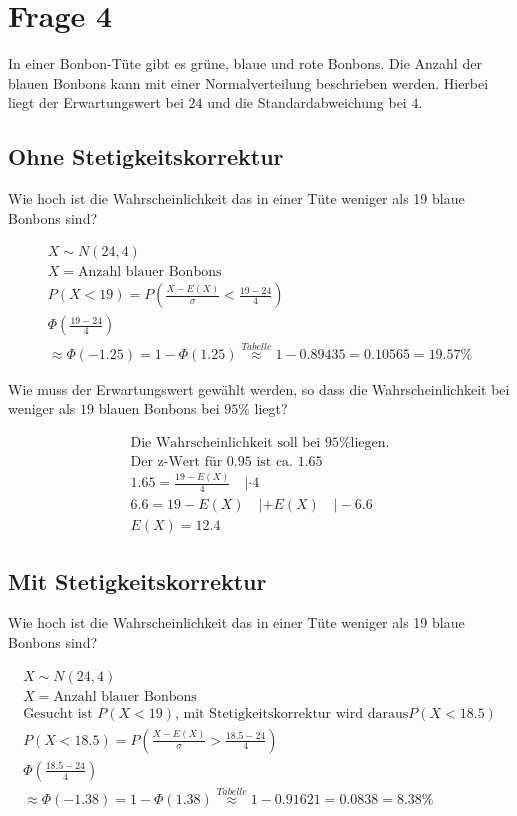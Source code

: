 \section{Frage 4}

In einer Bonbon-Tüte gibt es grüne, blaue und rote Bonbons. Die Anzahl der blauen Bonbons kann mit einer Normalverteilung beschrieben werden. Hierbei liegt der Erwartungswert bei $24$ und die Standardabweichung bei $4$.

\subsection{Ohne Stetigkeitskorrektur}

Wie hoch ist die Wahrscheinlichkeit das in einer Tüte weniger als 19 blaue Bonbons sind?

\begin{align*}
    X \sim N(24, 4) \\
    X = \text{Anzahl blauer Bonbons} \\
    P(X < 19) = P\left(\frac{X - E(X)}{\sigma} < \frac{19 - 24}{4}\right) \\
    \Phi(\frac{19 - 24}{4}) \\
    \approx \Phi(-1.25) = 1 - \Phi(1.25) \overset{Tabelle}{\approx} 1 - 0.89435 = 0.10565 = 19.57\%
\end{align*}

Wie muss der Erwartungswert gewählt werden, so dass die Wahrscheinlichkeit bei weniger als $19$ blauen Bonbons bei $95\%$ liegt?

\begin{align*}
    \text{Die Wahrscheinlichkeit soll bei 95\% liegen.} \\
    \text{Der z-Wert für 0.95 ist ca. 1.65} \\
    1.65 = \frac{19 - E(X)}{4} \quad | \cdot 4  \\
    6.6 = 19 - E(X) \quad | +E(X) \quad | -6.6 \\
    E(X) = 12.4
\end{align*}

\subsection{Mit Stetigkeitskorrektur}

Wie hoch ist die Wahrscheinlichkeit das in einer Tüte weniger als 19 blaue Bonbons sind?

\begin{align*}
    X \sim N(24, 4) \\
    X = \text{Anzahl blauer Bonbons} \\
    \text{Gesucht ist }P(X < 19) \text{, mit Stetigkeitskorrektur wird daraus} P(X < 18.5) \\
    P(X < 18.5) = P\left(\frac{X - E(X)}{\sigma} > \frac{18.5 - 24}{4}\right) \\
    \Phi(\frac{18.5 - 24}{4}) \\
    \approx \Phi(-1.38) = 1 - \Phi(1.38) \overset{Tabelle}{\approx} 1 - 0.91621 = 0.0838 = 8.38\%
\end{align*}

